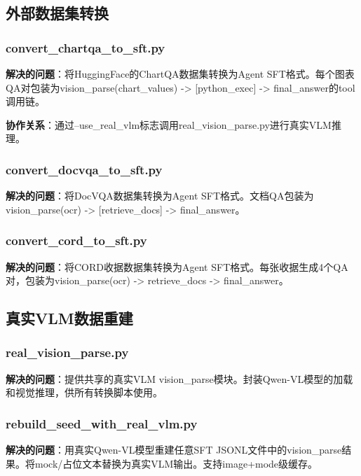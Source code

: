 \documentclass[fontset=none,11pt,a4paper]{ctexart}
\begin{document}
\subsection{外部数据集转换}

\subsubsection{convert\_chartqa\_to\_sft.py}

\textbf{解决的问题}：将HuggingFace的ChartQA数据集转换为Agent SFT格式。每个图表QA对包装为vision\_parse(chart\_values) -> [python\_exec] -> final\_answer的tool调用链。

\textbf{协作关系}：通过--use\_real\_vlm标志调用real\_vision\_parse.py进行真实VLM推理。

\subsubsection{convert\_docvqa\_to\_sft.py}

\textbf{解决的问题}：将DocVQA数据集转换为Agent SFT格式。文档QA包装为vision\_parse(ocr) -> [retrieve\_docs] -> final\_answer。

\subsubsection{convert\_cord\_to\_sft.py}

\textbf{解决的问题}：将CORD收据数据集转换为Agent SFT格式。每张收据生成4个QA对，包装为vision\_parse(ocr) -> retrieve\_docs -> final\_answer。

\subsection{真实VLM数据重建}

\subsubsection{real\_vision\_parse.py}

\textbf{解决的问题}：提供共享的真实VLM vision\_parse模块。封装Qwen-VL模型的加载和视觉推理，供所有转换脚本使用。

\subsubsection{rebuild\_seed\_with\_real\_vlm.py}

\textbf{解决的问题}：用真实Qwen-VL模型重建任意SFT JSONL文件中的vision\_parse结果。将mock/占位文本替换为真实VLM输出。支持image+mode级缓存。
\end{document}
